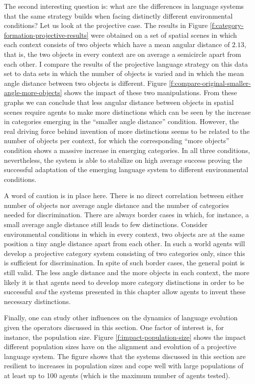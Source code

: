 The second interesting question is: what are the differences in language systems that
the same strategy builds when facing distinctly different environmental conditions? 
Let us look at the projective case. The results in Figure \ref{f:category-formation-projective-results}
were obtained on a set of spatial scenes in which each context consists of two objects
which have a mean angular distance of $2.13$, that is, the two objects in every context
are on average a semicircle apart from each other. I compare the results of
the projective language strategy on this data set to data sets in which the number of 
objects is varied and in which the mean angle distance between two objects is different. 
Figure \ref{f:compare-original-smaller-angle-more-objects}
shows the impact of these two manipulations. From these graphs we can
conclude that less angular distance between objects in spatial scenes require agents 
to make more distinctions which can be seen by the increase in categories 
emerging in the ``smaller angle distance'' condition. However, the real driving force 
behind invention of more distinctions seems to be related to the number of objects per context,
for which the corresponding ``more objects'' condition shows a massive increase in emerging
categories. In all three conditions, nevertheless, the system is able to stabilize on 
high average success proving the successful adaptation of the emerging language
system to different environmental conditions. 

A word of caution is in place here. There is no direct correlation between either number of 
objects nor average angle distance and the number of categories needed for discrimination. 
There are always border cases in which, for instance, a small average angle distance still leads to 
few distinctions. Consider environmental conditions in which in every context, two objects are 
at the same position a tiny angle distance
apart from each other. In such a world agents will develop a projective category system
consisting of two categories only, since this is sufficient for discrimination.
In spite of such border cases, the general point is still valid. The less angle distance
and the more objects in each context, the more likely it is that agents need to develop
more category distinctions in order to be successful \emph{and} the systems presented in this
chapter allow agents to invent these necessary distinctions.

Finally, one can study other influences on the dynamics of language evolution
given the operators discussed in this section. One factor of interest is, for instance,
the population size. Figure \ref{f:impact-population-size} shows the impact different
population sizes have on the alignment and evolution of a projective language
system. The figure shows that the systems discussed in this section are
resilient to increases in population sizes and cope well with large populations of at
least up to 100 agents (which is the maximum number of agents tested).

